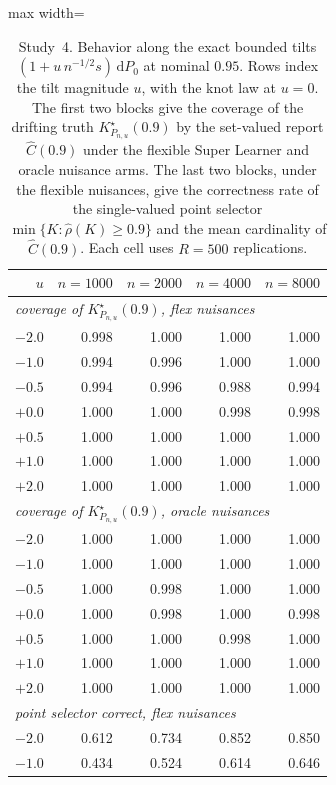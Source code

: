 \documentclass[11pt]{article}
\begin{document}
\begin{table}[ht!]
\centering
\caption{Study~4. Behavior along the exact bounded tilts $(1+u\,n^{-1/2}s)\,\mathrm dP_0$ at nominal $0.95$. Rows index the tilt magnitude $u$, with the knot law at $u=0$. The first two blocks give the coverage of the drifting truth $K^\star_{P_{n,u}}(0.9)$ by the set-valued report $\widehat C(0.9)$ under the flexible Super Learner and oracle nuisance arms. The last two blocks, under the flexible nuisances, give the correctness rate of the single-valued point selector $\min\{K:\hat\rho(K)\ge0.9\}$ and the mean cardinality of $\widehat C(0.9)$. Each cell uses $R=500$ replications.}
\label{tab:sims:study4b}
\begin{adjustbox}{max width=\textwidth}
\begin{tabular}{rrrrr}
\toprule
$u$ & $n=1000$ & $n=2000$ & $n=4000$ & $n=8000$\\
\midrule
\multicolumn{5}{l}{\textit{coverage of $K^\star_{P_{n,u}}(0.9)$, flex nuisances}}\\
$-2.0$ & 0.998 & 1.000 & 1.000 & 1.000\\
$-1.0$ & 0.994 & 0.996 & 1.000 & 1.000\\
$-0.5$ & 0.994 & 0.996 & 0.988 & 0.994\\
$+0.0$ & 1.000 & 1.000 & 0.998 & 0.998\\
$+0.5$ & 1.000 & 1.000 & 1.000 & 1.000\\
$+1.0$ & 1.000 & 1.000 & 1.000 & 1.000\\
$+2.0$ & 1.000 & 1.000 & 1.000 & 1.000\\
\midrule
\multicolumn{5}{l}{\textit{coverage of $K^\star_{P_{n,u}}(0.9)$, oracle nuisances}}\\
$-2.0$ & 1.000 & 1.000 & 1.000 & 1.000\\
$-1.0$ & 1.000 & 1.000 & 1.000 & 1.000\\
$-0.5$ & 1.000 & 0.998 & 1.000 & 1.000\\
$+0.0$ & 1.000 & 0.998 & 1.000 & 0.998\\
$+0.5$ & 1.000 & 1.000 & 0.998 & 1.000\\
$+1.0$ & 1.000 & 1.000 & 1.000 & 1.000\\
$+2.0$ & 1.000 & 1.000 & 1.000 & 1.000\\
\midrule
\multicolumn{5}{l}{\textit{point selector correct, flex nuisances}}\\
$-2.0$ & 0.612 & 0.734 & 0.852 & 0.850\\
$-1.0$ & 0.434 & 0.524 & 0.614 & 0.646\\

\end{tabular}
\end{adjustbox}
\end{table}
\end{document}
